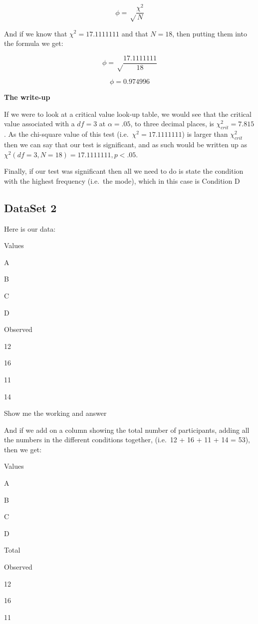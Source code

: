 \documentclass[
  oneside]{book}
\begin{document}
\[\phi = \sqrt\frac{\chi^2}{N}\]

And if we know that \(\chi^2 =17.1111111\) and that \(N = 18\), then putting them into the formula we get:

\[\phi = \sqrt\frac{17.1111111}{18}\]

\[\phi = 0.974996\]

\textbf{The write-up}

If we were to look at a critical value look-up table, we would see that the critical value associated with a \(df = 3\) at \(\alpha = .05\), to three decimal places, is \(\chi^2_{crit} = 7.815\). As the chi-square value of this test (i.e.~\(\chi^2 = 17.1111111\)) is larger than \(\chi^2_{crit}\) then we can say that our test is significant, and as such would be written up as \(\chi^2(df = 3, N = 18) = 17.1111111,p < .05\).

Finally, if our test was significant then all we need to do is state the condition with the highest frequency (i.e.~the mode), which in this case is Condition D

\hypertarget{dataset-2}{%
\subsection{DataSet 2}\label{dataset-2}}

Here is our data:

Values

A

B

C

D

Observed

12

16

11

14

Show me the working and answer

And if we add on a column showing the total number of participants, adding all the numbers in the different conditions together, (i.e.~12 + 16 + 11 + 14 = 53), then we get:

Values

A

B

C

D

Total

Observed

12

16

11
\end{document}
